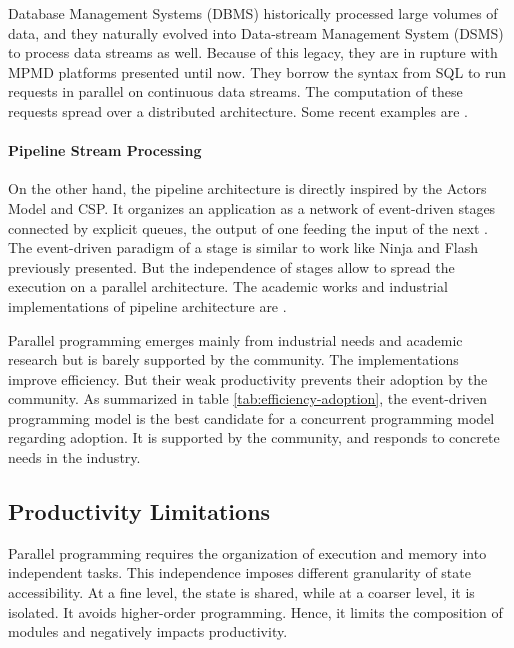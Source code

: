 Database Management Systems (DBMS) historically processed large volumes of data, and they naturally evolved into Data-stream Management System (DSMS) to process data streams as well.
Because of this legacy, they are in rupture with MPMD platforms presented until now.
They borrow the syntax from SQL to run requests in parallel on continuous data streams.
The computation of these requests spread over a distributed architecture.
Some recent examples are .

\paragraph{Pipeline Stream Processing}


On the other hand, the pipeline architecture is directly inspired by the Actors Model and CSP.
It organizes an application as a network of event-driven stages connected by explicit queues, the output of one feeding the input of the next \cite{Welsh2001}.
The event-driven paradigm of a stage is similar to work like Ninja \cite{Gribble2001} and Flash \cite{Pai1999} previously presented.
But the independence of stages allow to spread the execution on a parallel architecture.
The academic works and industrial implementations of pipeline architecture are .

\separator

Parallel programming emerges mainly from industrial needs and academic research but is barely supported by the community.
The implementations improve efficiency.
But their weak productivity prevents their adoption by the community.
As summarized in table \ref{tab:efficiency-adoption}, the event-driven programming model is the best candidate for a concurrent programming model regarding adoption.
It is supported by the community, and responds to concrete needs in the industry.


\subsection{Productivity Limitations} \label{chapter3:software-efficiency:productivity-limitations}

Parallel programming requires the organization of execution and memory into independent tasks.
This independence imposes different granularity of state accessibility.
At a fine level, the state is shared, while at a coarser level, it is isolated.
It avoids higher-order programming.
Hence, it limits the composition of modules and negatively impacts productivity.

